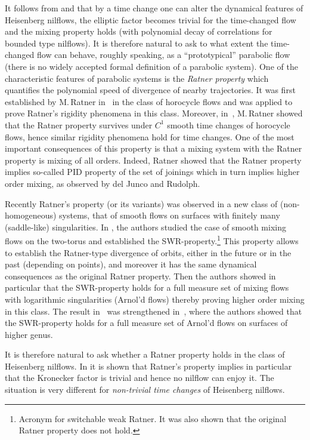 \documentclass[JEP,XML,SOM,Unicode,NoEqCountersInSection]{cedram}
\newcounter{case}
\theoremstyle{definition}
\theoremstyle{plain}
\begin{document}
It follows from \cite{AFU} and \cite{FK} that by a time change one can alter the dynamical features of Heisenberg nilflows, \ie the elliptic factor becomes trivial for the time-changed flow and the mixing property holds (with polynomial decay of correlations for bounded type nilflows). It is therefore natural to ask to what extent the time-changed flow can behave, roughly speaking, as a ``prototypical'' parabolic flow (there is no widely accepted formal definition of a parabolic system). One of the characteristic features of parabolic systems is the \emph{Ratner property} which quantifies the polynomial speed of divergence of nearby trajectories. It was first established by
M.\,Ratner in~\cite{Rat1} in the class of horocycle flows and was applied to prove Ratner's rigidity phenomena in this class. Moreover, in~\cite{Rat2}, M.\,Ratner showed that the Ratner property survives under $C^1$ smooth time changes of horocycle flows, hence similar rigidity phenomena hold for time changes. One of the most important consequences of this property is that a mixing system with the Ratner property is mixing of all orders. Indeed, Ratner showed that the Ratner property implies so-called PID property of the set of joinings which in turn implies higher order mixing, as observed by del Junco and Rudolph.

Recently Ratner's property (or its variants) was observed in a new class of (non-homogeneous) systems, that of smooth flows on surfaces with finitely many (saddle-like) singularities. In \cite{FayKa}, the authors studied the case of smooth mixing flows on the two-torus and established the SWR-property.\footnote{Acronym for switchable weak Ratner. It was also shown that the original Ratner property does not hold.} This property allows to establish the Ratner-type divergence of orbits, either in the future or in the past (depending on points), and moreover it has the same dynamical consequences as the original Ratner property. Then the authors showed in particular that the SWR-property holds for a full measure set of mixing flows with logarithmic singularities (Arnol'd flows) thereby proving higher order mixing in this class. The result in~\cite{FayKa} was strengthened in~\cite{KKU}, where the authors showed that the SWR-property holds for a full measure set of Arnol'd flows on surfaces of higher genus.\enlargethispage{3pt}%

It is therefore natural to ask whether a Ratner property holds in the class of Heisenberg nilflows. In \cite{KL} it is shown that Ratner's property implies in particular that the Kronecker factor is trivial and hence no nilflow can enjoy it. The situation is very different for \emph{non-trivial time changes} of Heisenberg nilflows.
\end{document}
